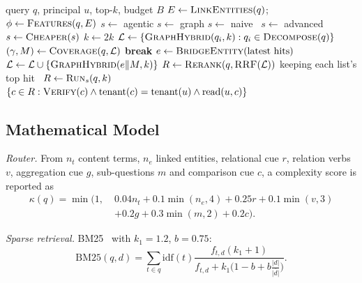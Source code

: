 \documentclass[journal]{IEEEtran}
\begin{document}
\begin{algorithm}[!htbp]
\caption{Adaptive routing and agentic retrieval}
\label{alg:route}
\footnotesize
\begin{algorithmic}[1]
\Require query $q$, principal $u$, top-$k$, budget $B$
\State $E \gets \textsc{LinkEntities}(q)$;\; $\phi \gets \textsc{Features}(q,E)$
 $s\gets$ agentic
 $s\gets$ graph
 $s\gets$ naive
\Else\ $s\gets$ advanced
\EndIf
{} $s\gets \textsc{Cheaper}(s)$
\EndWhile
{} $k\gets 2k$ 
\EndIf
{}
  \State $\mathcal{L}\gets\{\textsc{GraphHybrid}(q_i,k) : q_i\in \textsc{Decompose}(q)\}$
    \State $(\gamma, M)\gets \textsc{Coverage}(q,\mathcal{L})$
     \textbf{break} \EndIf
    \State $e\gets \textsc{BridgeEntity}(\text{latest hits})$ 
    \State $\mathcal{L}\gets \mathcal{L}\cup \{\textsc{GraphHybrid}(e \Vert M,k)\}$
  \EndFor
  \State $R\gets \textsc{Rerank}(q,\textsc{RRF}(\mathcal{L}))$ keeping each list's top hit
\Else\ $R\gets \textsc{Run}_s(q,k)$
\EndIf
\State \Return $\{c\in R : \textsc{Verify}(c)\wedge \mathrm{tenant}(c)=\mathrm{tenant}(u)\wedge \mathrm{read}(u,c)\}$
\end{algorithmic}
\end{algorithm}

\subsection{Mathematical Model}
\label{sec:math}
\textit{Router.} From $n_t$ content terms, $n_e$ linked entities, relational cue $r$, relation verbs $v$,
aggregation cue $g$, sub-questions $m$ and comparison cue $c$, a complexity score is reported as
\begin{equation}
\begin{split}
\kappa(q)=\min\big(1,\;&0.04n_t+0.1\min(n_e,4)+0.25r+0.1\min(v,3)\\
&+0.2g+0.3\min(m,2)+0.2c\big).
\end{split}
\end{equation}

\textit{Sparse retrieval.} BM25~\cite{robertson2009bm25} with $k_1=1.2$, $b=0.75$:
\begin{equation}
\mathrm{BM25}(q,d)=\sum_{t\in q}\mathrm{idf}(t)\frac{f_{t,d}(k_1+1)}{f_{t,d}+k_1\big(1-b+b\frac{|d|}{\overline{|d|}}\big)}.
\end{equation}
\end{document}
